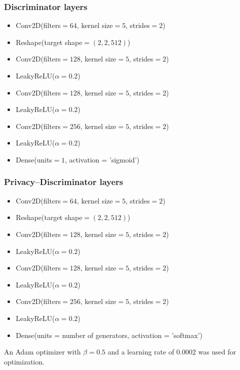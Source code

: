 \documentclass{article}
\begin{document}
\subsubsection*{Discriminator layers}
\begin{itemize}
\itemsep0em
    \item Conv2D(filters$= 64$, kernel size$=5$, strides$=2$)
    \item Reshape(target shape$= (2, 2, 512)$)
    \item Conv2D(filters$= 128$, kernel size$=5$, strides$=2$)
    \item LeakyReLU($\alpha=0.2$)
    \item Conv2D(filters$= 128$, kernel size$=5$, strides$=2$)
    \item LeakyReLU($\alpha=0.2$)
    \item Conv2D(filters$= 256$, kernel size$=5$, strides$=2$)
    \item LeakyReLU($\alpha=0.2$)
    \item Dense(units$=1$, activation = 'sigmoid')
\end{itemize}

\subsubsection*{Privacy--Discriminator layers}
\begin{itemize}
\itemsep0em
    \item Conv2D(filters$= 64$, kernel size$=5$, strides$=2$)
    \item Reshape(target shape$= (2, 2, 512)$)
    \item Conv2D(filters$= 128$, kernel size$=5$, strides$=2$)
    \item LeakyReLU($\alpha=0.2$)
    \item Conv2D(filters$= 128$, kernel size$=5$, strides$=2$)
    \item LeakyReLU($\alpha=0.2$)
    \item Conv2D(filters$= 256$, kernel size$=5$, strides$=2$)
    \item LeakyReLU($\alpha=0.2$)
    \item Dense(units = number of generators, activation = 'softmax')
\end{itemize}

An Adam optimizer with $\beta = 0.5$ and a learning rate of $0.0002$ was used for optimization.
\end{document}
